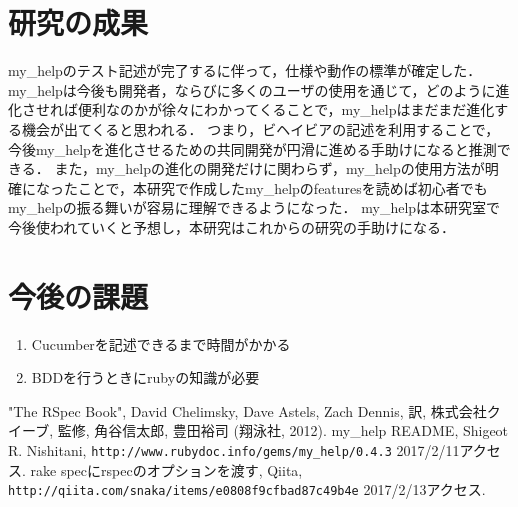 \documentclass[10pt,a4j,twocolumn]{jsarticle}
\begin{document}
\section{研究の成果}
my\_helpのテスト記述が完了するに伴って，仕様や動作の標準が確定した．
my\_helpは今後も開発者，ならびに多くのユーザの使用を通じて，どのように進化させれば便利なのかが徐々にわかってくることで，my\_helpはまだまだ進化する機会が出てくると思われる．
つまり，ビヘイビアの記述を利用することで，今後my\_helpを進化させるための共同開発が円滑に進める手助けになると推測できる．
また，my\_helpの進化の開発だけに関わらず，my\_helpの使用方法が明確になったことで，本研究で作成したmy\_helpのfeaturesを読めば初心者でもmy\_helpの振る舞いが容易に理解できるようになった．
my\_helpは本研究室で今後使われていくと予想し，本研究はこれからの研究の手助けになる．

\section{今後の課題}
\begin{enumerate}
\item Cucumberを記述できるまで時間がかかる
\item BDDを行うときにrubyの知識が必要
\end{enumerate}

\begin{flushleft}
\begin{thebibliography}{99}
   "The RSpec Book", David Chelimsky, Dave Astels, Zach Dennis, 訳, 株式会社クイーブ, 監修, 角谷信太郎, 豊田裕司 (翔泳社, 2012).
   my\_help README, Shigeot R. Nishitani, \verb|http://www.rubydoc.info/gems/my_help/0.4.3| 2017/2/11アクセス.
   rake specにrspecのオプションを渡す, Qiita, \verb|http://qiita.com/snaka/items/e0808f9cfbad87c49b4e| 2017/2/13アクセス.
\end{thebibliography}
\end{flushleft}
\end{document}
